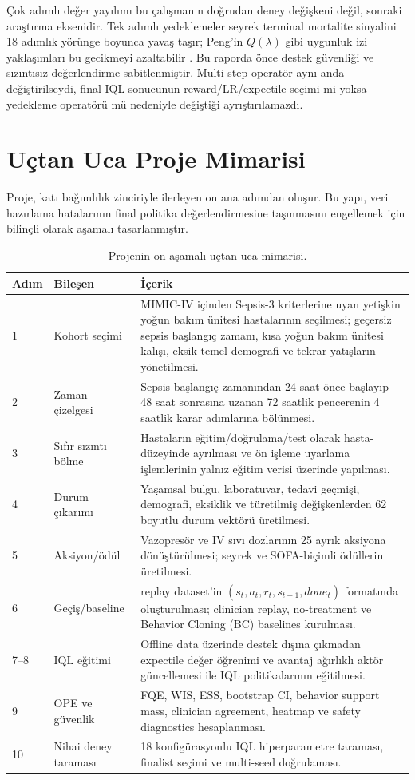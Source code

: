 \documentclass[conference]{IEEEtran}
\begin{document}
Çok adımlı değer yayılımı bu çalışmanın doğrudan deney değişkeni değil, sonraki araştırma eksenidir. Tek adımlı yedeklemeler seyrek terminal mortalite sinyalini 18 adımlık yörünge boyunca yavaş taşır; Peng'in $Q(\lambda)$ gibi uygunluk izi yaklaşımları bu gecikmeyi azaltabilir \cite{peng1996qlambda}. Bu raporda önce destek güvenliği ve sızıntısız değerlendirme sabitlenmiştir. Multi-step operatör aynı anda değiştirilseydi, final IQL sonucunun reward/LR/expectile seçimi mi yoksa yedekleme operatörü mü nedeniyle değiştiği ayrıştırılamazdı.

\section{Uçtan Uca Proje Mimarisi}
Proje, katı bağımlılık zinciriyle ilerleyen on ana adımdan oluşur. Bu yapı, veri hazırlama hatalarının final politika değerlendirmesine taşınmasını engellemek için bilinçli olarak aşamalı tasarlanmıştır.

\begin{table}[t]
\centering
\caption{Projenin on aşamalı uçtan uca mimarisi.}
\label{tab:ten_steps}
\begin{tabular}{p{}p{}p{}}
\toprule
Adım & Bileşen & İçerik \\
\midrule
1 & Kohort seçimi & MIMIC-IV içinden Sepsis-3 kriterlerine uyan yetişkin yoğun bakım ünitesi hastalarının seçilmesi; geçersiz sepsis başlangıç zamanı, kısa yoğun bakım ünitesi kalışı, eksik temel demografi ve tekrar yatışların yönetilmesi. \\
2 & Zaman çizelgesi & Sepsis başlangıç zamanından 24 saat önce başlayıp 48 saat sonrasına uzanan 72 saatlik pencerenin 4 saatlik karar adımlarına bölünmesi. \\
3 & Sıfır sızıntı bölme & Hastaların eğitim/doğrulama/test olarak hasta-düzeyinde ayrılması ve ön işleme uyarlama işlemlerinin yalnız eğitim verisi üzerinde yapılması. \\
4 & Durum çıkarımı & Yaşamsal bulgu, laboratuvar, tedavi geçmişi, demografi, eksiklik ve türetilmiş değişkenlerden 62 boyutlu durum vektörü üretilmesi. \\
5 & Aksiyon/ödül & Vazopresör ve IV sıvı dozlarının 25 ayrık aksiyona dönüştürülmesi; seyrek ve SOFA-biçimli ödüllerin üretilmesi. \\
6 & Geçiş/baseline & replay dataset'in $(s_t,a_t,r_t,s_{t+1},done_t)$ formatında oluşturulması; clinician replay, no-treatment ve Behavior Cloning (BC) baselines kurulması. \\
7--8 & IQL eğitimi & Offline data üzerinde destek dışına çıkmadan expectile değer öğrenimi ve avantaj ağırlıklı aktör güncellemesi ile IQL politikalarının eğitilmesi. \\
9 & OPE ve güvenlik & FQE, WIS, ESS, bootstrap CI, behavior support mass, clinician agreement, heatmap ve safety diagnostics hesaplanması. \\
10 & Nihai deney taraması & 18 konfigürasyonlu IQL hiperparametre taraması, finalist seçimi ve multi-seed doğrulaması. \\
\bottomrule
\end{tabular}
\end{table}
\end{document}
